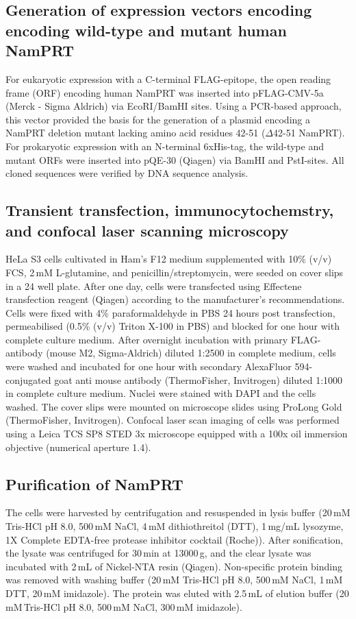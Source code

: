 \subsection{Generation of expression vectors encoding encoding wild-type and mutant human NamPRT}

For eukaryotic expression with a C-terminal FLAG-epitope, the open reading frame (ORF) encoding human NamPRT was inserted into pFLAG-CMV-5a (Merck - Sigma Aldrich) via EcoRI/BamHI sites. Using a PCR-based approach, this vector provided the basis for the generation of a plasmid encoding a NamPRT deletion mutant lacking amino acid residues 42-51 ($\Delta$42-51 NamPRT). For prokaryotic expression with an N-terminal 6xHis-tag, the wild-type and mutant ORFs were inserted into pQE-30 (Qiagen) via BamHI and PstI-sites. All cloned sequences were verified by DNA sequence analysis.


\subsection{Transient transfection, immunocytochemstry, and confocal laser scanning microscopy}

HeLa S3 cells cultivated in Ham’s F12 medium supplemented with 10\% (v/v) FCS, 2\,mM L-glutamine, and penicillin/streptomycin, were seeded on cover slips in a 24 well plate. After one day, cells were transfected using Effectene transfection reagent (Qiagen) according to the manufacturer’s recommendations. Cells were fixed with 4\% paraformaldehyde in PBS 24 hours post transfection, permeabilised (0.5\% (v/v) Triton X-100 in PBS) and blocked for one hour with complete culture medium. After overnight incubation with primary FLAG-antibody (mouse M2, Sigma-Aldrich) diluted 1:2500 in complete medium, cells were washed and incubated for one hour with secondary AlexaFluor 594-conjugated goat anti mouse antibody (ThermoFisher, Invitrogen) diluted 1:1000 in complete culture medium. Nuclei were stained with DAPI and the cells washed. The cover slips were mounted on microscope slides using ProLong Gold (ThermoFisher, Invitrogen). Confocal laser scan imaging of cells was performed using a Leica TCS SP8 STED 3x microscope equipped with a 100x oil immersion objective (numerical aperture 1.4).


\subsection{Purification of NamPRT}

The cells were harvested by centrifugation and resuspended in lysis buffer (20\,mM Tris-HCl pH 8.0, 500\,mM NaCl, 4\,mM dithiothreitol (DTT), 1\,mg/mL lysozyme, 1X Complete EDTA-free protease inhibitor cocktail (Roche)). After sonification, the lysate was centrifuged for 30\,min at 13000\,g, and the clear lysate was incubated with 2\,mL of Nickel-NTA resin (Qiagen). Non-specific protein binding was removed with washing buffer (20\,mM Tris-HCl pH 8.0, 500\,mM NaCl, 1\,mM DTT, 20\,mM imidazole). The protein was eluted with 2.5\,mL of elution buffer (20 mM\,Tris-HCl pH 8.0, 500\,mM NaCl, 300\,mM imidazole).

